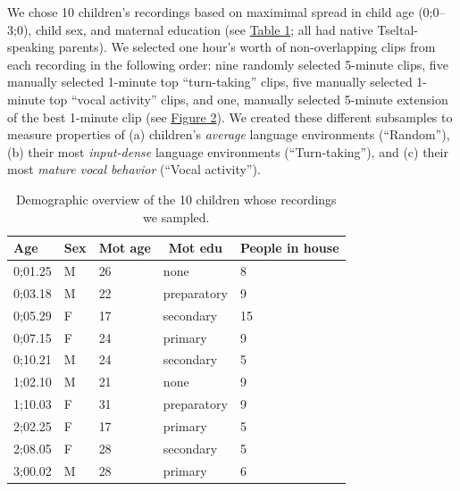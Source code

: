 \documentclass[floatsintext,man]{apa6}
\theoremstyle{definition}
\theoremstyle{definition}
\theoremstyle{definition}
\theoremstyle{remark}
\begin{document}
We chose 10 children's recordings based on maximimal spread in child age
(0;0--3;0), child sex, and maternal education (see
\protect\hyperlink{tab1}{Table 1}; all had native Tseltal-speaking
parents). We selected one hour's worth of non-overlapping clips from
each recording in the following order: nine randomly selected 5-minute
clips, five manually selected 1-minute top \enquote{turn-taking} clips,
five manually selected 1-minute top \enquote{vocal activity} clips, and
one, manually selected 5-minute extension of the best 1-minute clip (see
\protect\hyperlink{fig2}{Figure 2}). We created these different
subsamples to measure properties of (a) children's \emph{average}
language environments (\enquote{Random}), (b) their most
\emph{input-dense} language environments (\enquote{Turn-taking}), and
(c) their most \emph{mature vocal behavior} (\enquote{Vocal activity}).

\begin{table}[tbp]
\begin{center}
\begin{threeparttable}
\caption{\label{tab:tab1}Demographic overview of the 10 children whose recordings we sampled.}
\begin{tabular}{lllll}
\toprule
Age & \multicolumn{1}{c}{Sex} & \multicolumn{1}{c}{Mot age} & \multicolumn{1}{c}{Mot edu} & \multicolumn{1}{c}{People in house}\\
\midrule
0;01.25 & M & 26 & none & 8\\
0;03.18 & M & 22 & preparatory & 9\\
0;05.29 & F & 17 & secondary & 15\\
0;07.15 & F & 24 & primary & 9\\
0;10.21 & M & 24 & secondary & 5\\
1;02.10 & M & 21 & none & 9\\
1;10.03 & F & 31 & preparatory & 9\\
2;02.25 & F & 17 & primary & 5\\
2;08.05 & F & 28 & secondary & 5\\
3;00.02 & M & 28 & primary & 6\\
\bottomrule
\end{tabular}
\end{threeparttable}
\end{center}
\end{table}
\end{document}

